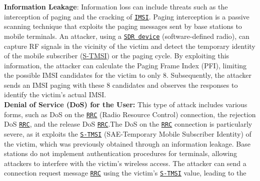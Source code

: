 \documentclass[english]{article}
\begin{document}
\textbf{Information Leakage}:
Information loss can include threats such as the interception of
paging and the cracking of \texttt{\hyperlink{IMSI}{IMSI}}. Paging
interception is a passive scanning technique that exploits the
paging messages sent by base stations to mobile terminals. An
attacker, using a \texttt{\hyperlink{SDR}{SDR device}}
(software-defined radio), can capture RF signals in the vicinity
of the victim and detect the temporary identity of the mobile
subscriber (\hyperlink{S-TMSI}{S-TMSI}) or the paging cycle. By
exploiting this information, the attacker can calculate the
Paging Frame Index (PFI), limiting the possible IMSI candidates
for the victim to only 8. Subsequently, the attacker sends an
IMSI paging with these 8 candidates and observes the responses
to identify the victim's actual IMSI.
\\[0.2cm]
\textbf{Denial of Service (DoS) for the User:}
This type of attack includes various forms,
such as DoS on the \texttt{\hyperlink{RRC}{RRC}} (Radio Resource Control)
connection, the rejection DoS \texttt{\hyperlink{RRC}{RRC}}, and the release
DoS \texttt{\hyperlink{RRC}{RRC}}.\@ The DoS on the \texttt{\hyperlink{RRC}{RRC}}
connection is particularly severe, as it exploits the
\texttt{\hyperlink{S-TMSI}{S-TMSI}} (SAE-Temporary Mobile Subscriber Identity)
of the victim, which was previously obtained through an information leakage.
Base stations do not implement authentication procedures for terminals,
allowing attackers to interfere with the victim's wireless access.
The attacker can send a connection request message \texttt{\hyperlink{RRC}{RRC}}
using the victim's \texttt{\hyperlink{S-TMSI}{S-TMSI}} value, leading to the
\end{document}
